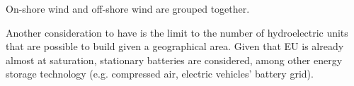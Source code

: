 On-shore wind and off-shore wind are grouped together.

Another consideration to have is the limit to the number of hydroelectric units that are possible to build given a geographical area. Given that EU is already almost at saturation, stationary batteries are considered, among other energy storage technology (e.g. compressed air, electric vehicles' battery grid).



